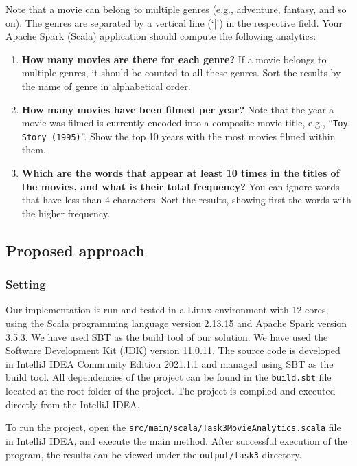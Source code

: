 \documentclass[acmlarge]{acmart}
\begin{document}
Note that a movie can belong to multiple genres (e.g., adventure, fantasy, and so on). The genres are separated by a vertical line (`|') in the respective field. Your Apache Spark (Scala) application should compute the following analytics:
\begin{enumerate}
  \item \textbf{How many movies are there for each genre?} If a movie belongs to multiple genres, it should be counted to all these genres. Sort the results by the name of genre in alphabetical order.
  \item \textbf{How many movies have been filmed per year?} Note that the year a movie was filmed is currently encoded into a composite movie title, e.g., ``\texttt{Toy Story (1995)}''. Show the top 10 years with the most movies filmed within them.
  \item \textbf{Which are the words that appear at least 10 times in the titles of the movies, and what is their total frequency?} You can ignore words that have less than 4 characters. Sort the results, showing first the words with the higher frequency.
\end{enumerate}

\subsection{Proposed approach}
\subsubsection{Setting}
Our implementation is run and tested in a Linux environment with 12 cores, using the Scala programming language version 2.13.15 and Apache Spark version 3.5.3. We have used SBT as the build tool of our solution.
We have used the Software Development Kit (JDK) version 11.0.11.
The source code is developed in IntelliJ IDEA Community Edition 2021.1.1 and managed using SBT as the build tool. All dependencies of the project can be found in the \texttt{build.sbt} file located at the root folder of the project.
The project is compiled and executed directly from the IntelliJ IDEA.

To run the project, open the \texttt{src/main/scala/Task3MovieAnalytics.scala} file in IntelliJ IDEA, and execute the main method. After successful execution of the program, the results can be viewed under the \texttt{output/task3} directory.
\end{document}
